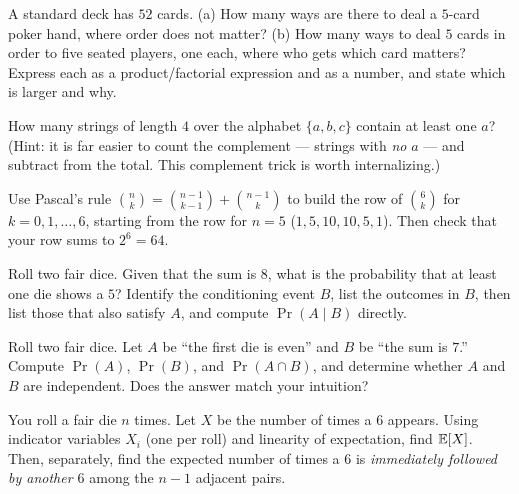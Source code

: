 \begin{exercise}
A standard deck has $52$ cards. (a) How many ways are there to deal a $5$-card poker
hand, where order does not matter? (b) How many ways to deal $5$ cards in order to five
seated players, one each, where who gets which card matters? Express each as a
product/factorial expression and as a number, and state which is larger and why.
\end{exercise}

\begin{exercise}
How many strings of length $4$ over the alphabet $\{a,b,c\}$ contain at least one
$a$? (Hint: it is far easier to count the complement --- strings with \emph{no} $a$ ---
and subtract from the total. This complement trick is worth internalizing.)
\end{exercise}

\begin{exercise}
Use Pascal's rule $\binom{n}{k} = \binom{n-1}{k-1} + \binom{n-1}{k}$ to build the row
of $\binom{6}{k}$ for $k = 0, 1, \dots, 6$, starting from the row for $n = 5$
($1,5,10,10,5,1$). Then check that your row sums to $2^6 = 64$.
\end{exercise}

\begin{exercise}
Roll two fair dice. Given that the sum is $8$, what is the probability that at least one
die shows a $5$? Identify the conditioning event $B$, list the outcomes in $B$, then
list those that also satisfy $A$, and compute $\Pr(A \mid B)$ directly.
\end{exercise}

\begin{exercise}
Roll two fair dice. Let $A$ be ``the first die is even'' and $B$ be ``the sum is
$7$.'' Compute $\Pr(A)$, $\Pr(B)$, and $\Pr(A \cap B)$, and determine whether $A$ and
$B$ are independent. Does the answer match your intuition?
\end{exercise}

\begin{exercise}
You roll a fair die $n$ times. Let $X$ be the number of times a $6$ appears. Using
indicator variables $X_i$ (one per roll) and linearity of expectation, find $\mathbb{E}[X]$.
Then, separately, find the expected number of times a $6$ is \emph{immediately
followed by another $6$} among the $n-1$ adjacent pairs.
\end{exercise}

